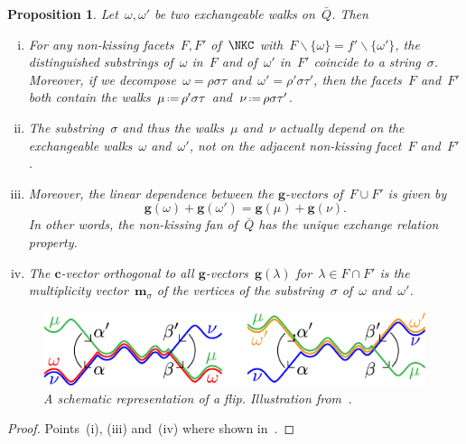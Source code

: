 \documentclass{amsart}
\newtheorem{proposition}[theorem]{Proposition}
\theoremstyle{definition}
\renewcommand{\b}[1]{{\boldsymbol{#1}}} %
\newcommand{\ssm}{\smallsetminus} %
\newcommand{\eqdef}{\mbox{\,\raisebox{0.2ex}{\scriptsize\ensuremath{\mathrm:}}\ensuremath{=}\,}} %
\newcommand{\vincent}[1]{\todo[color=blue!30]{#1 \\ \hfill --- V.}}
\newcommand{\multiplicityVector}{\b{m}} %
\newcommand{\gvector}[1]{\b{g}(#1)} %
\newcommand{\quiver}{\bar Q} %
\begin{document}
\begin{proposition}
\label{prop:exchangeablePairsNKC}
Let~$\omega, \omega'$ be two exchangeable walks on~$\quiver$. Then
\begin{enumerate}[(i)]
\item For any non-kissing facets~$F, F'$ of~$\NKC$ with~$F \ssm \{\omega\} = f' \ssm \{\omega'\}$, the distinguished substrings of~$\omega$ in~$F$ and of~$\omega'$ in~$F'$ coincide to a string~$\sigma$. Moreover, if we decompose~$\omega = \rho \sigma \tau$ and~$\omega' = \rho' \sigma \tau'$, then the facets~$F$ and~$F'$ both contain the walks~$\mu \eqdef \rho' \sigma \tau$ and~$\nu \eqdef \rho \sigma \tau'$.
\item The substring~$\sigma$ and thus the walks~$\mu$ and~$\nu$ actually depend on the exchangeable walks~$\omega$ and~$\omega'$, not on the adjacent non-kissing facet~$F $ and~$F'$.
\item Moreover, the linear dependence between the $\b{g}$-vectors of~$F \cup F'$ is given by
\[
\gvector{\omega} + \gvector{\omega'} = \gvector{\mu} + \gvector{\nu}.
\]
In other words, the non-kissing fan of~$\quiver$ has the unique exchange relation property.
\item The $\b{c}$-vector orthogonal to all $\b{g}$-vectors~$\gvector{\lambda}$ for~$\lambda \in F \cap F'$ is the multiplicity vector~$\multiplicityVector_{\sigma}$ of the vertices of the substring~$\sigma$ of~$\omega$ and~$\omega'$.
\end{enumerate}
%
\begin{figure}[t]
	\capstart
	\centerline{\includegraphics[scale=1]{flip}}
	\caption{A schematic representation of a flip. Illustration from~\cite{PaluPilaudPlamondon-nonkissing}.}
	\label{fig:flip}
\end{figure}
\end{proposition}

\begin{proof}
Points~(i), (iii) and~(iv) where shown in~\cite[Prop.~2.33, Thm.~4.17 \& Prop~4.16]{PaluPilaudPlamondon-nonkissing}.
\vincent{Point~(ii) to prove.}
\end{proof}
\end{document}
